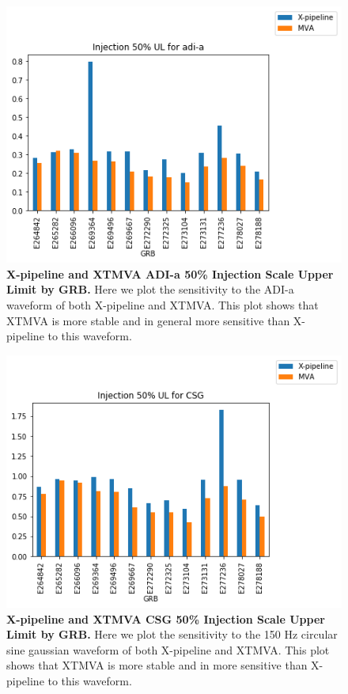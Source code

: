 \documentclass[11pt]{cuthesis}
\newcommand{\xp}{X-pipeline }
\begin{document}
\begin{figure} %
\begin{center}
\includegraphics[width=1.0\linewidth]{adi_injscale_comparison.png}
\end{center}
\caption{\textbf{\xp and XTMVA  ADI-a 50\% Injection Scale Upper Limit by GRB.} Here we plot the sensitivity to the ADI-a waveform of both \xp and XTMVA. This plot shows that XTMVA is more stable and in general more sensitive than \xp to this waveform. }
\label{fig:adi comparison}
\end{figure}

\begin{figure} %
\begin{center}
\includegraphics[width=1.0\linewidth]{csg_injscale_comparison.png}
\end{center}
\caption{\textbf{\xp and XTMVA  CSG 50\% Injection Scale Upper Limit by GRB.} Here we plot the sensitivity to the 150 Hz circular sine gaussian waveform of both \xp and XTMVA. This plot shows that XTMVA is more stable and in more sensitive than \xp to this waveform.  }
\label{fig:csg comparison}
\end{figure}
\end{document}
